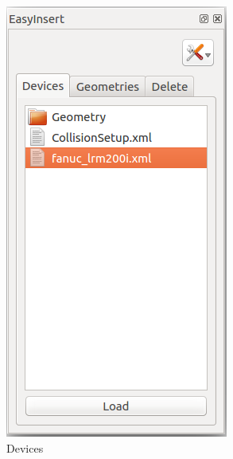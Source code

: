 \begin{figure}[h] %
        \begin{subfigure}[b]{0.32\textwidth}
                \centering
                \includegraphics[width=.95\linewidth]{Figures/EasyInsertDevice.png}
  				\caption{Devices}
 				\label{fig:EasyInsertDevice}
        \end{subfigure}%
        \begin{subfigure}[b]{0.32\textwidth}

\end{subfigure}
\end{figure}
